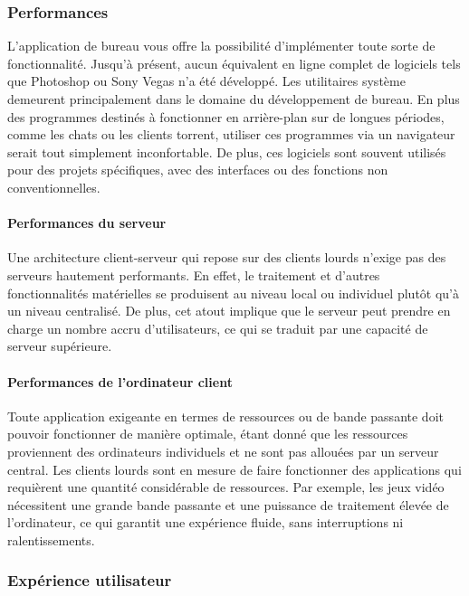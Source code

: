 \documentclass[a4paper, 12pt, french]{article}
\begin{document}
			\subsubsection{Performances}
				L'application de bureau vous offre la possibilité d'implémenter toute sorte de fonctionnalité. Jusqu'à présent, aucun équivalent en ligne complet de logiciels tels que Photoshop ou Sony Vegas n'a été développé. Les utilitaires système demeurent principalement dans le domaine du développement de bureau. En plus des programmes destinés à fonctionner en arrière-plan sur de longues périodes, comme les chats ou les clients torrent, utiliser ces programmes via un navigateur serait tout simplement inconfortable. De plus, ces logiciels sont souvent utilisés pour des projets spécifiques, avec des interfaces ou des fonctions non conventionnelles.

				\paragraph{Performances du serveur\\}
					Une architecture client-serveur qui repose sur des clients lourds n'exige pas des serveurs hautement performants. En effet, le traitement et d'autres fonctionnalités matérielles se produisent au niveau local ou individuel plutôt qu'à un niveau centralisé. De plus, cet atout implique que le serveur peut prendre en charge un nombre accru d'utilisateurs, ce qui se traduit par une capacité de serveur supérieure.

				\paragraph{Performances de l'ordinateur client\\}
					Toute application exigeante en termes de ressources ou de bande passante doit pouvoir fonctionner de manière optimale, étant donné que les ressources proviennent des ordinateurs individuels et ne sont pas allouées par un serveur central. Les clients lourds sont en mesure de faire fonctionner des applications qui requièrent une quantité considérable de ressources. Par exemple, les jeux vidéo nécessitent une grande bande passante et une puissance de traitement élevée de l'ordinateur, ce qui garantit une expérience fluide, sans interruptions ni ralentissements.
			
			\subsubsection{Expérience utilisateur}
\end{document}
